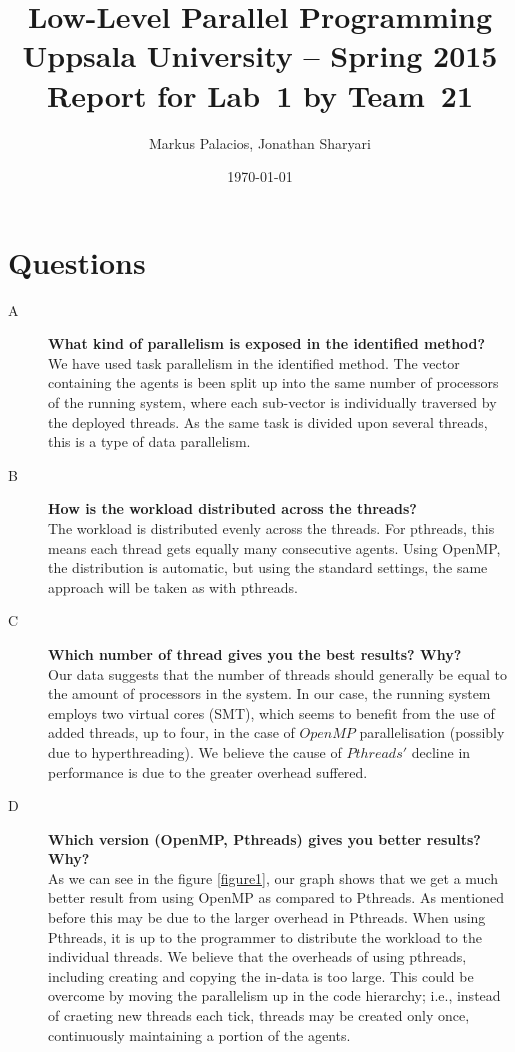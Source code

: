 \documentclass[a4paper,11pt]{article}
\title{\textbf{Low-Level Parallel Programming \\
    Uppsala University -- Spring 2015 \\
    Report for Lab~1
    by Team~21  %
  }
}
\author{Markus Palacios, Jonathan Sharyari} %
\date{\today}
\begin{document}
\maketitle

\section{Questions}
\begin{description}
    \item[A] \textbf{What kind of parallelism is exposed in the identified method?}
 \hfill \\We have used task parallelism in the identified method. The vector containing the agents is been split up into the same number of processors of the running system, where each sub-vector is individually traversed by the deployed threads. As the same task is divided upon several threads, this is a type of data parallelism.
    \item[B] \textbf{How is the workload distributed across the threads?} \hfill \\The workload is distributed evenly across the threads. For pthreads, this means each thread gets equally many consecutive agents. Using OpenMP, the distribution is automatic, but using the standard settings, the same approach will be taken as with pthreads.
    \item[C] \textbf{Which number of thread gives you the best results? Why?} \hfill \\Our data suggests that the number of threads should generally be equal to the amount of processors in the system. In our case, the running system employs two virtual cores (SMT), which seems to benefit from the use of added threads, up to four, in the case of $OpenMP$ parallelisation (possibly due to hyperthreading). We believe the cause of $Pthreads'$ decline in performance is due to the greater overhead suffered. 
    \item[D] \textbf{Which version (OpenMP, Pthreads) gives you better results? Why?} \hfill \\As we can see in the figure \ref{figure1}, our graph shows that we get a much better result from using OpenMP as compared to Pthreads. As mentioned before this may be due to the larger overhead in Pthreads. When using Pthreads, it is up to the programmer to distribute the workload to the individual threads. We believe that the overheads of using pthreads, including creating and copying the in-data is too large. This could be overcome by moving the parallelism up in the code hierarchy; i.e., instead of craeting new threads each tick, threads may be created only once, continuously  maintaining a portion of the agents.
\end{description}
\end{document}
